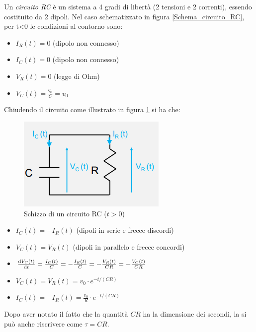 \documentclass{article}
\begin{document}
Un \textit{circuito RC} è un sistema a 4 gradi di libertà (2 tensioni e 2 correnti), essendo costituito da 2 dipoli. Nel caso schematizzato in figura \ref{Schema_circuito_RC}, per t<0 le condizioni al contorno sono:

\begin{itemize}
  \item $I_R (t) = 0$ (dipolo non connesso)
  \item $I_C (t) = 0$ (dipolo non connesso)
  \item $V_R (t) = 0$ (legge di Ohm)
  \item $V_C (t) = \frac{q_0}{C} = v_0$
\end{itemize}
\newpage
Chiudendo il circuito come illustrato in figura \ref{Schema_circuito_RC_chiuso} si ha che:

\begin{figure}[h]
  \centering
  \includegraphics[scale=0.7]{IM_circuito_RC_chiuso}
  \caption{Schizzo di un circuito RC ($t>0$)}
  \label{Schema_circuito_RC_chiuso}
\end{figure}

\begin{itemize}
  \item $I_C (t) = - I_R (t)$ (dipoli in serie e frecce discordi)
  \item $V_C (t) = V_R (t)$ (dipoli in parallelo e frecce concordi)
  \item $\frac{\textrm d V_C (t)}{\textrm d t} = \frac{I_C (t)}{C} = - \frac{I_R (t)}{C} = -\frac{V_R (t)}{CR} = -\frac{V_C (t)}{CR}$
  \item $V_C (t) = V_R (t) = v_0 \cdot e^{-t/(CR)}$
  \item $I_C (t) = -I_R (t) = \frac{v_0}{R} \cdot e^{-t/(CR)}$
\end{itemize}

Dopo aver notato il fatto che la quantità $CR$ ha la dimensione dei secondi, la si può anche riscrivere come $\tau = CR$.
\end{document}
